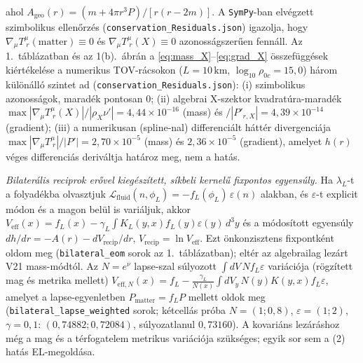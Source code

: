 \documentclass[10pt,a4paper]{article}
\begin{document}
ahol $A_{\text{geo}}(r) = (m + 4\pi r^3 P)/[r(r-2m)]$. A \texttt{SymPy}-ban elvégzett szimbolikus ellenőrzés (\texttt{conservation\_Residuals.json}) igazolja, hogy $\nabla_\mu T^\mu_{\;r}(\text{matter}) \equiv 0$ és $\nabla_\mu T^\mu_{\;r}(X) \equiv 0$ azonosságszerűen fennáll. Az 1.\ táblázatban és az 1(b).\ ábrán a \eqref{eq:mass_X}--\eqref{eq:grad_X} összefüggések kiértékelése a numerikus TOV-rácsokon ($L=10\,\text{km}$, $\log_{10}\rho_{0c}=15{,}0$) három különálló szintet ad (\texttt{conservation\_Residuals.json}): (i) szimbolikus azonosságok, maradék pontosan $0$; (ii) algebrai X-szektor kvadratúra-maradék $\max|\nabla_\mu T^\mu_{\;r}(X)|/|\rho_X\nu'| = 4{,}44\times 10^{-16}$ (mass) és $/|P'_{r,X}| = 4{,}39\times 10^{-14}$ (gradient); (iii) a numerikusan (spline-nal) differenciált háttér divergenciája $\max|\nabla_\mu T^\mu_{\;r}|/|P'| = 2{,}70\times 10^{-5}$ (mass) és $2{,}36\times 10^{-5}$ (gradient), amelyet $h(r)$ véges differenciás deriváltja határoz meg, nem a hatás.

\emph{Bilaterális reciprok erővel kiegészített, síkbeli kernelű fixpontos egyensúly.} Ha $\lambda_L$-t a folyadékba olvasztjuk $\mathcal{L}_{\text{fluid}}(n,\phi_L) = -f_L(\phi_L)\,\varepsilon(n)$ alakban, és $\varepsilon$-t explicit módon és a magon belül is variáljuk, akkor $V_{\text{eff}}(x) = f_L(x) - \gamma_L\!\int K_L(y,x) f_L(y)\varepsilon(y)\,d^3y$ és a módosított egyensúly $dh/dr = -A(r) - dV_{\text{recip}}/dr$, $V_{\text{recip}} = \ln V_{\text{eff}}$. Ezt önkonzisztens fixpontként oldom meg (\texttt{bilateral\_eom} sorok az 1.\ táblázatban); eltér az algebrailag lezárt V21 mass-módtól. Az $N=e^\nu$ lapse-szal súlyozott $\int dV\,N f_L\varepsilon$ variációja (rögzített mag és metrika mellett) $V_{\text{eff},N}(x)=f_L-\frac{\gamma_L}{N(x)}\!\int dV_y\,N(y)K(y,x)f_L\varepsilon$, amelyet a lapse-egyenletben $P_{\text{matter}}=f_LP$ mellett oldok meg (\texttt{bilateral\_lapse\_weighted} sorok; kétcellás próba $N=(1;0{,}8)$, $\varepsilon=(1;2)$, $\gamma=0{,}1$: $(0{,}74882;0{,}72084)$, súlyozatlanul $0{,}73160$). A kovariáns lezáráshoz még a mag és a térfogatelem metrikus variációja szükséges; egyik sor sem a (2) hatás EL-megoldása.
\end{document}
